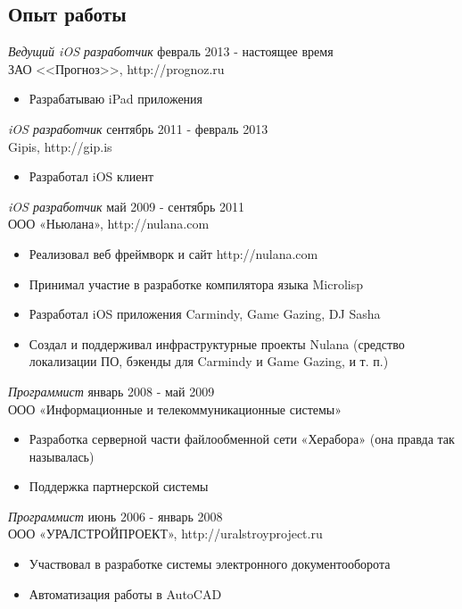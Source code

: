 \documentclass[12pt]{res} %
\begin{document}
\begin{resume}
\section{Опыт работы}

{\sl Ведущий iOS разработчик} \hfill февраль 2013 - настоящее время \\
ЗАО <<Прогноз>>, http://prognoz.ru 
\begin{itemize} 
\item Разрабатываю iPad приложения
\end{itemize}

{\sl iOS разработчик} \hfill сентябрь 2011 - февраль 2013 \\
Gipis, http://gip.is 
\begin{itemize} 
\item Разработал iOS клиент
\end{itemize}

{\sl iOS разработчик} \hfill май 2009 - сентябрь 2011 \\
ООО «Ньюлана», http://nulana.com
\begin{itemize} 
\item Реализовал веб фреймворк и сайт http://nulana.com
\item Принимал участие в разработке компилятора языка Microlisp 
\item Разработал iOS приложения Carmindy, Game Gazing, DJ Sasha
\item Создал и поддерживал инфраструктурные проекты Nulana (средство локализации ПО, бэкенды для Carmindy и Game Gazing, и т. п.)
\end{itemize} 

{\sl Программист} \hfill январь 2008 - май 2009 \\
ООО «Информационные и телекоммуникационные системы»
\begin{itemize}
\item Разработка серверной части файлообменной сети «Херабора» (она правда так называлась)
\item Поддержка партнерской системы
\end{itemize} 

{\sl Программист} \hfill июнь 2006 - январь 2008 \\
ООО «УРАЛСТРОЙПРОЕКТ», http://uralstroyproject.ru
\begin{itemize}
\item Участвовал в разработке системы электронного документооборота
\item Автоматизация работы в AutoCAD
\end{itemize} 


\end{resume}
\end{document}

